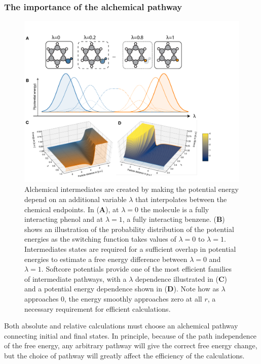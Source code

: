 \documentclass[9pt,bestpractices]{livecoms}
\begin{document}
\subsubsection{The importance of the alchemical pathway
\label{sec:important_path}}
\begin{figure}
    \includegraphics[width=0.95\linewidth]{figures/fig7_what_is_lam/Figure.pdf}
    \caption{Alchemical intermediates are created by making the potential energy depend on an additional variable $\lambda$ that interpolates between the chemical endpoints. In (\textbf{A}), at $\lambda=0$ the molecule is a fully interacting phenol and at $\lambda=1$,  a fully interacting benzene. (\textbf{B}) shows an illustration of the probability distribution of the potential energies as the switching function takes values of $\lambda=0$ to $\lambda=1$. Intermediates states are required for a sufficient overlap in potential energies to estimate a free energy difference between $\lambda=0$ and $\lambda=1$.
    Softcore potentials provide one of the most efficient families of intermediate pathways, with a $\lambda$ dependence illustrated in (\textbf{C}) and a potential energy dependence shown in (\textbf{D}). Note how as $\lambda$ approaches 0, the energy smoothly approaches zero at all $r$, a necessary requirement for efficient calculations.  }
    \label{fig:fig_what_is_lambda}
\end{figure}
%
Both absolute and relative calculations must choose an alchemical pathway connecting initial and final states. In principle, because of the path independence of the free energy, any arbitrary pathway will give the correct free energy change, but the choice of pathway will greatly affect the efficiency of the calculations. 
\end{document}
